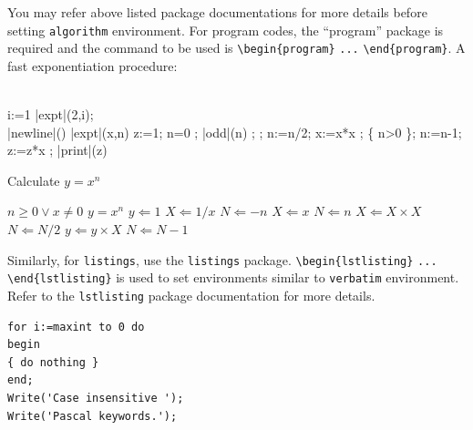 \documentclass[sn-mathphys]{sn-jnl}%
\theoremstyle{thmstyleone}%
\theoremstyle{thmstyletwo}%
\theoremstyle{thmstylethree}%
\begin{document}
You may refer above listed package documentations for more details before setting \verb+algorithm+ environment. For program codes, the ``program'' package is required and the command to be used is \verb+\begin{program}+ \verb+...+ \verb+\end{program}+. A fast exponentiation procedure:

\begin{program}
\BEGIN \\ %
  \FOR i:=1   \DO
     |expt|(2,i); \\ |newline|() \OD %
\WHERE
\PROC |expt|(x,n) \BODY
          z:=1;
          \DO \IF n=0 \THEN \EXIT \FI;
             \DO \IF |odd|(n) \THEN \EXIT \FI;
;
                n:=n/2; x:=x*x \OD;
             \{ n>0 \};
             n:=n-1; z:=z*x \OD;
          |print|(z) \ENDPROC
\END
\end{program}


\begin{algorithm}
\caption{Calculate $y = x^n$}\label{algo1}
\begin{algorithmic}[1]
\Require $n \geq 0 \vee x \neq 0$
\Ensure $y = x^n$ 
\State $y \Leftarrow 1$
\label{algln2}
        \State $X \Leftarrow 1 / x$
        \State $N \Leftarrow -n$
\Else
        \State $X \Leftarrow x$
        \State $N \Leftarrow n$
\EndIf
{}
            \State $X \Leftarrow X \times X$
            \State $N \Leftarrow N / 2$
        \Else[$N$ is odd]
            \State $y \Leftarrow y \times X$
            \State $N \Leftarrow N - 1$
        \EndIf
\EndWhile
\end{algorithmic}
\end{algorithm}
\bigskip

Similarly, for \verb+listings+, use the \verb+listings+ package. \verb+\begin{lstlisting}+ \verb+...+ \verb+\end{lstlisting}+ is used to set environments similar to \verb+verbatim+ environment. Refer to the \verb+lstlisting+ package documentation for more details.

\bigskip
\begin{minipage}{\hsize}%
\lstset{frame=single,framexleftmargin=-1pt,framexrightmargin=-17pt,framesep=12pt,linewidth=0.98\textwidth,language=pascal}%
\begin{lstlisting}
for i:=maxint to 0 do
begin
{ do nothing }
end;
Write('Case insensitive ');
Write('Pascal keywords.');
\end{lstlisting}
\end{minipage}
\end{document}
